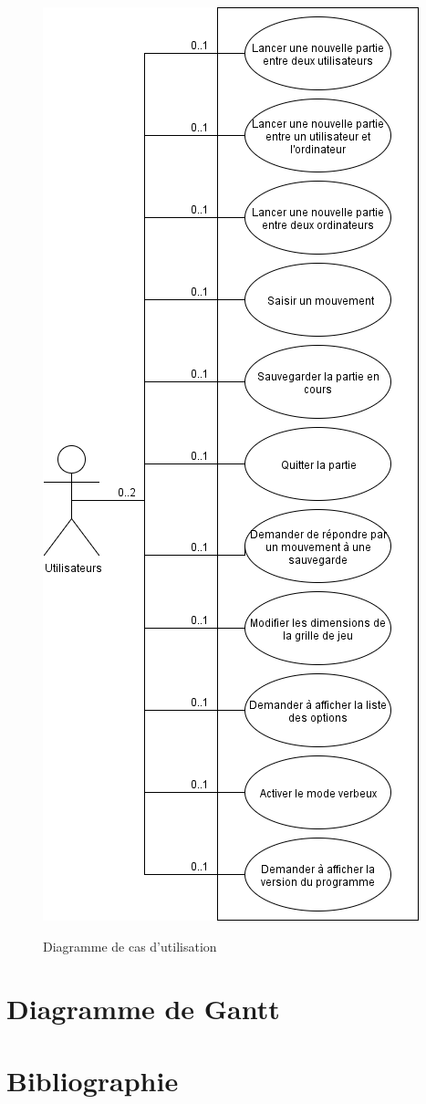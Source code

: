 \documentclass[10pt,a4paper]{article}
\begin{document}
\begin{figure}[H]
\centering
\includegraphics[scale=0.5]{images/use_case.png}
\label{use_case}
\caption{Diagramme de cas d'utilisation}
\end{figure}

\section{Diagramme de Gantt}

\section{Bibliographie}
\end{document}
